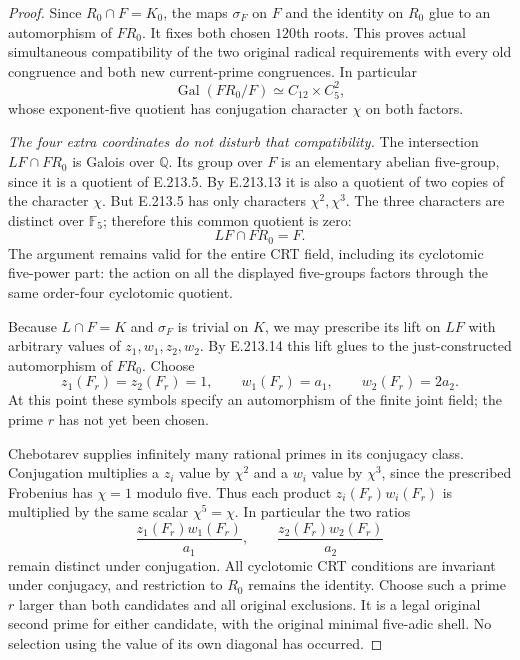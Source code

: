 \begin{proof}
Since $R_0\cap F=K_0$, the maps $\sigma_F$ on $F$ and
the identity on $R_0$ glue to an automorphism of $FR_0$.
It fixes both chosen $120$th roots. This proves actual
simultaneous compatibility of the two original radical
requirements with every old congruence and both new
current-prime congruences. In particular
\[
 \operatorname{Gal}(FR_0/F)\simeq C_{12}\times C_5^2,
 \tag{E.213.13}
\]
whose exponent-five quotient has conjugation character
$\chi$ on both factors.

\emph{The four extra coordinates do not disturb that compatibility.}
The intersection $LF\cap FR_0$ is Galois over $\mathbb Q$.
Its group over $F$ is an elementary abelian five-group,
since it is a quotient of E.213.5. By E.213.13 it is also
a quotient of two copies of the character $\chi$.
But E.213.5 has only characters $\chi^2,\chi^3$.
The three characters are distinct over $\mathbb F_5$;
therefore this common quotient is zero:
\[
                             LF\cap FR_0=F.                  \tag{E.213.14}
\]
The argument remains valid for the entire CRT field,
including its cyclotomic five-power part: the action on
all the displayed five-groups factors through the same
order-four cyclotomic quotient.

Because $L\cap F=K$ and $\sigma_F$ is trivial on $K$,
we may prescribe its lift on $LF$ with arbitrary values
of $z_1,w_1,z_2,w_2$. By E.213.14 this lift glues to
the just-constructed automorphism of $FR_0$.
Choose
\[
 z_1(F_r)=z_2(F_r)=1,\qquad
 w_1(F_r)=a_1,\qquad w_2(F_r)=2a_2.                           \tag{E.213.15}
\]
At this point these symbols specify an automorphism of
the finite joint field; the prime $r$ has not yet been
chosen.

Chebotarev supplies infinitely many rational primes in
its conjugacy class. Conjugation multiplies a $z_i$ value
by $\chi^2$ and a $w_i$ value by $\chi^3$, since the
prescribed Frobenius has $\chi=1$ modulo five.
Thus each product $z_i(F_r)w_i(F_r)$ is multiplied by
the same scalar $\chi^5=\chi$. In particular the two
ratios
\[
      \frac{z_1(F_r)w_1(F_r)}{a_1},
      \qquad
      \frac{z_2(F_r)w_2(F_r)}{a_2}                            \tag{E.213.16}
\]
remain distinct under conjugation. All cyclotomic CRT
conditions are invariant under conjugacy, and restriction
to $R_0$ remains the identity. Choose such a prime $r$
larger than both candidates and all original exclusions.
It is a legal original second prime for either candidate,
with the original minimal five-adic shell. No selection
using the value of its own diagonal has occurred.


\end{proof}
